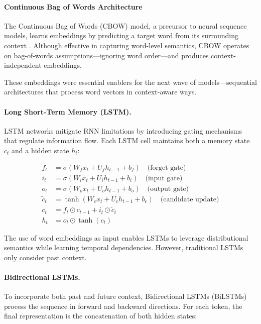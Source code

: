 \documentclass{article}
\begin{document}
\paragraph{Continuous Bag of Words Architecture}

The Continuous Bag of Words (CBOW) model, a precursor to neural sequence models, learns embeddings by predicting a target word from its surrounding context \cite{mikolov2013efficient}. Although effective in capturing word-level semantics, CBOW operates on bag-of-words assumptions—ignoring word order—and produces context-independent embeddings.

These embeddings were essential enablers for the next wave of models—sequential architectures that process word vectors in context-aware ways.

\paragraph{Long Short-Term Memory (LSTM).}
LSTM networks mitigate RNN limitations by introducing gating mechanisms that regulate information flow. Each LSTM cell maintains both a memory state $c_t$ and a hidden state $h_t$:

\begin{align*}
f_t &= \sigma(W_f x_t + U_f h_{t-1} + b_f) \quad \text{(forget gate)} \\
i_t &= \sigma(W_i x_t + U_i h_{t-1} + b_i) \quad \text{(input gate)} \\
o_t &= \sigma(W_o x_t + U_o h_{t-1} + b_o) \quad \text{(output gate)} \\
\tilde{c}_t &= \tanh(W_c x_t + U_c h_{t-1} + b_c) \quad \text{(candidate update)} \\
c_t &= f_t \odot c_{t-1} + i_t \odot \tilde{c}_t \\
h_t &= o_t \odot \tanh(c_t)
\end{align*}

The use of word embeddings as input enables LSTMs to leverage distributional semantics while learning temporal dependencies. However, traditional LSTMs only consider past context.

\paragraph{Bidirectional LSTMs.}
To incorporate both past and future context, Bidirectional LSTMs (BiLSTMs) \cite{huang2015bidirectional} process the sequence in forward and backward directions. For each token, the final representation is the concatenation of both hidden states:
\end{document}
